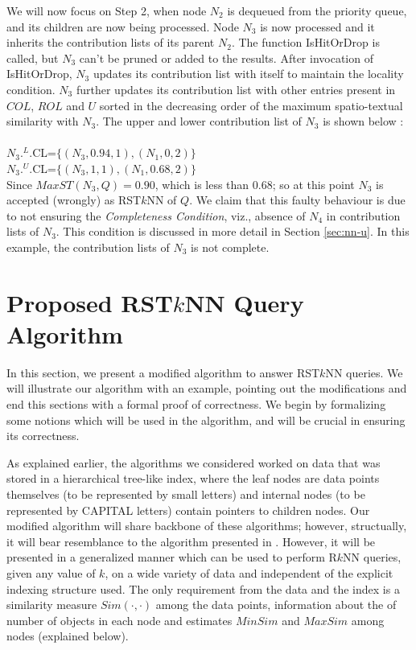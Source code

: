 \documentclass[prodmode,letterpaper]{acmsmall}
\newcommand{\rknn}{R$k$NN\xspace}
\newcommand{\rstknn}{RST$k$NN\xspace}
\begin{document}
We will now focus on Step 2, when node $N_2$ is dequeued from the priority queue,
and its children are now being processed.
Node $N_3$ is now processed and it inherits the contribution lists of its parent $N_2$. The function IsHitOrDrop is called, but $N_3$  can't be pruned or added to the results. After invocation of IsHitOrDrop, $N_3$ updates its contribution list with itself to maintain the locality condition. $N_3$ further updates its contribution list with other entries present in $COL$, $ROL$ and $U$ sorted in the decreasing order of the maximum spatio-textual similarity with $N_3$. The upper and lower contribution list of $N_3$ is shown below :\\ \\
$N_3.^{L}$.CL=$\lbrace (N_3,0.94,1),(N_1,0,2) \rbrace$\\
$N_3.^{U}$.CL=$\lbrace (N_3,1,1),(N_1, 0.68,2) \rbrace$\\
Since $MaxST(N_3,Q)=0.90$, which is less than 0.68; so at this point 
$N_3$ is accepted (wrongly) as \rstknn of $Q$.
We claim that this faulty
behaviour is due to not ensuring the {\em Completeness Condition}, viz.,
absence of $N_4$ in contribution lists of $N_3$.
This condition is discussed in more detail in Section \ref{sec:nn-u}. In this
example, the contribution lists of $N_3$ is not complete.



\section{Proposed \rstknn Query Algorithm }\label{section:algo}
In this section, we present a modified algorithm to answer \rstknn
queries. We will illustrate our algorithm with an example, pointing
out the modifications and end this sections with a formal
proof of correctness. We begin by formalizing some notions which will be
used in the algorithm, and will be crucial in ensuring its correctness.

As explained earlier, the algorithms we considered worked on data that was stored in a hierarchical
tree-like index, where the leaf nodes are data points themselves (to
be represented by small letters) and internal nodes (to be represented by
CAPITAL letters) contain pointers to children
nodes.
Our modified algorithm will share backbone of these algorithms; however,
structually, it will bear resemblance to the algorithm presented in
\cite{lu2011reverse,lu2014efficient}. However, it will be presented in a
generalized manner which can be used to perform \rknn queries, given any value
of $k$, on a wide variety of data and 
independent of the explicit indexing structure used.
The only requirement from the data and the index is a similarity measure $Sim(\cdot,\cdot)$
among the data points, information about the of number of objects in each
node and estimates $MinSim$ and $MaxSim$ among nodes (explained below).
\end{document}
